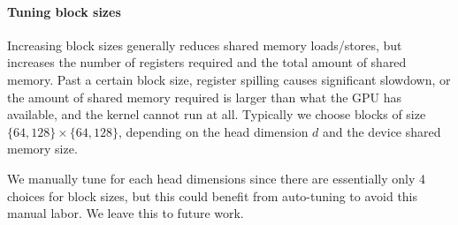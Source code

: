 \paragraph{Tuning block sizes}
Increasing block sizes generally reduces shared memory loads/stores, but
increases the number of registers required and the total amount of shared
memory.
Past a certain block size, register spilling causes significant slowdown, or the
amount of shared memory required is larger than what the GPU has available, and
the kernel cannot run at all.
Typically we choose blocks of size $\{64, 128\} \times \{64, 128\}$, depending on the
head dimension $d$ and the device shared memory size.

We manually tune for each head dimensions since there are essentially only 4
choices for block sizes, but this could benefit from auto-tuning to avoid this
manual labor.
We leave this to future work.